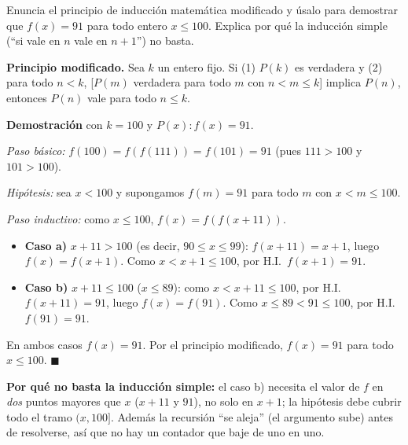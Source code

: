 \begin{prob}
Enuncia el principio de inducción matemática modificado y úsalo para demostrar que $f(x)=91$ para todo entero $x\le100$. Explica por qué la inducción simple (``si vale en $n$ vale en $n+1$'') no basta.
\end{prob}
\begin{sol}
\textbf{Principio modificado.} Sea $k$ un entero fijo. Si (1) $P(k)$ es verdadera y (2) para todo $n<k$, [$P(m)$ verdadera para todo $m$ con $n<m\le k$] implica $P(n)$, entonces $P(n)$ vale para todo $n\le k$.

\textbf{Demostración} con $k=100$ y $P(x): f(x)=91$.

\emph{Paso básico:} $f(100)=f(f(111))=f(101)=91$ (pues $111>100$ y $101>100$).

\emph{Hipótesis:} sea $x<100$ y supongamos $f(m)=91$ para todo $m$ con $x<m\le100$.

\emph{Paso inductivo:} como $x\le100$, $f(x)=f(f(x+11))$.
\begin{itemize}
\item \textbf{Caso a)} $x+11>100$ (es decir, $90\le x\le99$): $f(x+11)=x+1$, luego $f(x)=f(x+1)$. Como $x<x+1\le100$, por H.I.\ $f(x+1)=91$.
\item \textbf{Caso b)} $x+11\le100$ ($x\le89$): como $x<x+11\le100$, por H.I.\ $f(x+11)=91$, luego $f(x)=f(91)$. Como $x\le89<91\le100$, por H.I.\ $f(91)=91$.
\end{itemize}
En ambos casos $f(x)=91$. Por el principio modificado, $f(x)=91$ para todo $x\le100$. $\blacksquare$

\textbf{Por qué no basta la inducción simple:} el caso b) necesita el valor de $f$ en \emph{dos} puntos mayores que $x$ ($x+11$ y $91$), no solo en $x+1$; la hipótesis debe cubrir todo el tramo $(x,100]$. Además la recursión ``se aleja'' (el argumento sube) antes de resolverse, así que no hay un contador que baje de uno en uno.
\end{sol}


